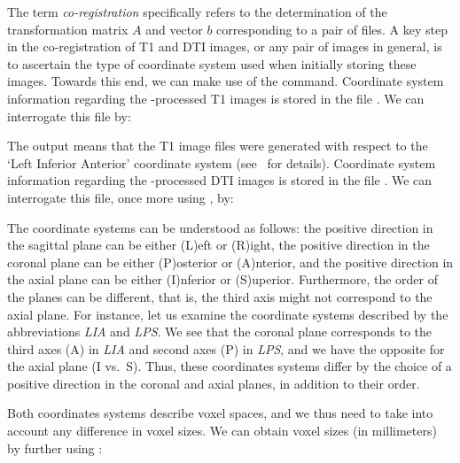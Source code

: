 The term \textit{co-registration} specifically refers to the
determination of the transformation matrix $A$ and vector $b$
corresponding to a pair of files.  %
%
A key step in the co-registration of T1 and DTI images, or any pair
of images in general, is to ascertain the type of coordinate system
used when initially storing these images. Towards this end, we can
make use of the  command.  Coordinate system
information regarding the {\freesurfer}-processed T1 images is stored
in the file . We can interrogate this file by:

\noindent The output  means that the T1 image files were
generated with respect to the `Left Inferior Anterior' coordinate
system (see~\cite{freesurfer-wiki} for details).  Coordinate system
information regarding the {\freesurfer}-processed DTI images is stored
in the file . We can interrogate this file, once
more using , by:


The coordinate systems can be understood as follows: the positive
direction in the sagittal plane can be either (L)eft or (R)ight, the
positive direction in the coronal plane can be either (P)osterior or
(A)nterior, and the positive direction in the axial plane can be either
(I)nferior or (S)uperior. Furthermore, the order of the planes can be
different, that is, the third axis might not correspond to the axial
plane. For instance, let us examine the coordinate systems described
by the abbreviations \emph{LIA} and \emph{LPS}. We see that the coronal
plane corresponds to the third axes (A) in \emph{LIA} and second axes
(P) in \emph{LPS}, and we have the opposite for the axial plane (I
vs.~S). Thus, these coordinates systems differ by the choice of a 
positive direction in the coronal and axial planes, in addition to
their order.

Both coordinates systems describe voxel spaces, and we thus need to take into 
account any difference in voxel sizes. We can obtain voxel sizes (in millimeters) 
by further using : 

